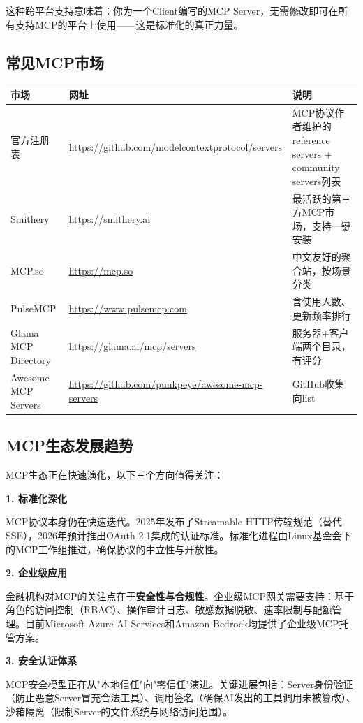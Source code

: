 这种跨平台支持意味着：你为一个Client编写的MCP Server，无需修改即可在所有支持MCP的平台上使用——这是标准化的真正力量。

\subsection{常见MCP市场}

\begin{table}[H]
\centering
\begin{tabular}{lp{4cm}p{5cm}}
\toprule
\textbf{市场} & \textbf{网址} & \textbf{说明} \\
\midrule
官方注册表 & \url{https://github.com/modelcontextprotocol/servers} & MCP协议作者维护的reference servers + community servers列表 \\
Smithery & \url{https://smithery.ai} & 最活跃的第三方MCP市场，支持一键安装 \\
MCP.so & \url{https://mcp.so} & 中文友好的聚合站，按场景分类 \\
PulseMCP & \url{https://www.pulsemcp.com} & 含使用人数、更新频率排行 \\
Glama MCP Directory & \url{https://glama.ai/mcp/servers} & 服务器+客户端两个目录，有评分 \\
Awesome MCP Servers & \url{https://github.com/punkpeye/awesome-mcp-servers} & GitHub收集向list \\
\bottomrule
\end{tabular}
\end{table}

\subsection{MCP生态发展趋势}

MCP生态正在快速演化，以下三个方向值得关注：

\textbf{1. 标准化深化}

MCP协议本身仍在快速迭代。2025年发布了Streamable HTTP传输规范（替代SSE），2026年预计推出OAuth 2.1集成的认证标准。标准化进程由Linux基金会下的MCP工作组推进，确保协议的中立性与开放性。

\textbf{2. 企业级应用}

金融机构对MCP的关注点在于\textbf{安全性与合规性}。企业级MCP网关需要支持：基于角色的访问控制（RBAC）、操作审计日志、敏感数据脱敏、速率限制与配额管理。目前Microsoft Azure AI Services和Amazon Bedrock均提供了企业级MCP托管方案。

\textbf{3. 安全认证体系}

MCP安全模型正在从"本地信任"向"零信任"演进。关键进展包括：Server身份验证（防止恶意Server冒充合法工具）、调用签名（确保AI发出的工具调用未被篡改）、沙箱隔离（限制Server的文件系统与网络访问范围）。

